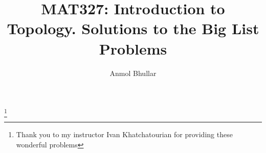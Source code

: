 \documentclass{amstext-l}
\theoremstyle{definition}
\theoremstyle{remark}
\numberwithin{section}{chapter}
\numberwithin{equation}{chapter}
\begin{document}
\frontmatter

\title{MAT327: Introduction to Topology. Solutions to the Big List Problems}


\author{Anmol Bhullar}
\address{ Undergraduate Student University of Toronto, Scarborough}
\thanks{Thank you to my instructor Ivan Khatchatourian for providing these wonderful problems}


\keywords{}

\maketitle


\setcounter{page}{5}

\tableofcontents



\mainmatter



\appendix


\backmatter



\printindex
\end{document}
